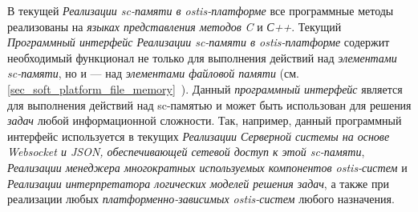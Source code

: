 В текущей \textit{Реализации sc-памяти в ostis-платформе} все программные методы реализованы на \textit{языках представления методов} \textit{C} и \textit{С++}. Текущий \textit{Программный интерфейс Реализации sc-памяти в ostis-платформе} содержит необходимый функционал не только для выполнения действий над \textit{элементами sc-памяти}, но и --- над \textit{элементами файловой памяти} (см. \ref{sec_soft_platform_file_memory}~). Данный \textit{программный интерфейс} является   для выполнения действий над sc-памятью и может быть использован для решения \textit{задач} любой информационной сложности. Так, например, данный программный интерфейс используется в текущих \textit{Реализации Серверной системы на основе Websocket и JSON, обеспечивающей сетевой доступ к этой sc-памяти}, \textit{Реализации менеджера многократных используемых компонентов ostis-систем} и \textit{Реализации интерпретатора логических моделей решения задач}, а также при реализации любых \textit{платформенно-зависимых ostis-систем} любого назначения.

